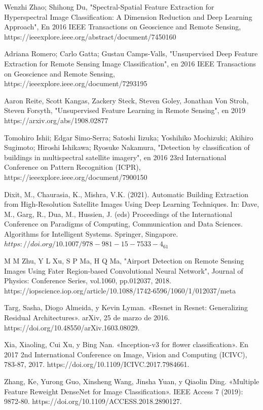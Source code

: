 \documentclass[article]{llncs}
\begin{document}
\begin{thebibliography}{8}
        Wenzhi Zhao; Shihong Du, "Spectral-Spatial Feature Extraction for Hyperspectral Image Classification: A Dimension Reduction and Deep Learning Approach", En 2016 IEEE Transactions on Geoscience and Remote Sensing, https://ieeexplore.ieee.org/abstract/document/7450160

        Adriana Romero; Carlo Gatta; Gustau Camps-Valls, "Unsupervised Deep Feature Extraction for Remote Sensing Image Classification", en 2016 IEEE Transactions on Geoscience and Remote Sensing, https://ieeexplore.ieee.org/document/7293195
    
        Aaron Reite, Scott Kangas, Zackery Steck, Steven Goley, Jonathan Von Stroh, Steven Forsyth, "Unsupervised Feature Learning in Remote Sensing", en 2019 https://arxiv.org/abs/1908.02877

        Tomohiro Ishii; Edgar Simo-Serra; Satoshi Iizuka; Yoshihiko Mochizuki; Akihiro Sugimoto; Hiroshi Ishikawa; Ryosuke Nakamura, "Detection by classification of buildings in multispectral satellite imagery", en 2016 23rd International Conference on Pattern Recognition (ICPR), https://ieeexplore.ieee.org/document/7900150
    
        Dixit, M., Chaurasia, K., Mishra, V.K. (2021). Automatic Building Extraction from High-Resolution Satellite Images Using Deep Learning Techniques. In: Dave, M., Garg, R., Dua, M., Hussien, J. (eds) Proceedings of the International Conference on Paradigms of Computing, Communication and Data Sciences. Algorithms for Intelligent Systems. Springer, Singapore. $https://doi.org/10.1007/978-981-15-7533-4_61$
        
        M M Zhu, Y L Xu, S P Ma, H Q Ma, "Airport Detection on Remote Sensing Images Using Fater Region-based Convolutional Neural Network", Journal of Physics: Conference Series, vol.1060, pp.012037, 2018. https://iopscience.iop.org/article/10.1088/1742-6596/1060/1/012037/meta

        Targ, Sasha, Diogo Almeida, y Kevin Lyman. «Resnet in Resnet: Generalizing Residual Architectures». arXiv, 25 de marzo de 2016. https://doi.org/10.48550/arXiv.1603.08029.

        Xia, Xiaoling, Cui Xu, y Bing Nan. «Inception-v3 for flower classification». En 2017 2nd International Conference on Image, Vision and Computing (ICIVC), 783-87, 2017. https://doi.org/10.1109/ICIVC.2017.7984661.

        Zhang, Ke, Yurong Guo, Xinsheng Wang, Jinsha Yuan, y Qiaolin Ding. «Multiple Feature Reweight DenseNet for Image Classification». IEEE Access 7 (2019): 9872-80. https://doi.org/10.1109/ACCESS.2018.2890127.


  \end{thebibliography}
\end{document}
